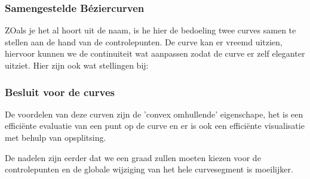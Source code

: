 \documentclass[12pt,a4paper]{article}
\begin{document}
	\subsubsection*{Samengestelde Béziercurven}
	ZOals je het al hoort uit de naam, is he hier de bedoeling twee curves samen te stellen aan de hand van de controlepunten. De curve kan er vreemd uitzien, hiervoor kunnen we de continuiteit wat aanpassen zodat de curve er zelf eleganter uitziet. Hier zijn ook wat stellingen bij: 
	\begin{figure}[H]
		\centering
		\label{fig:samengestelden}
	\end{figure}

	\subsubsection*{Besluit voor de curves}
	De voordelen van deze curven zijn de 'convex omhullende' eigenschape, het is een efficiënte evaluatie van een punt op de curve en er is ook een efficiënte visualisatie met behulp van opsplitsing. 
	
	De nadelen zijn eerder dat we een graad zullen moeten kiezen voor de controlepunten en de globale wijziging van het hele curvesegment is moeilijker. 
	
	
\end{document}
